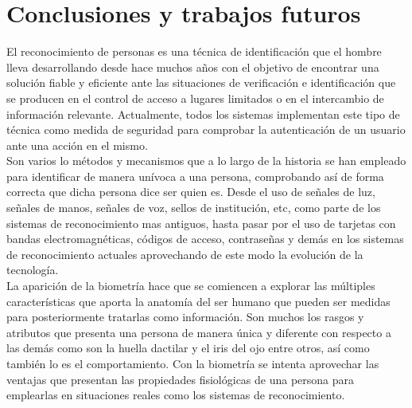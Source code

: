 
\chapter{Conclusiones y trabajos futuros} %

\label{Capítulo 6} %





El reconocimiento de personas es una técnica de identificación que el hombre lleva desarrollando desde hace muchos años con el objetivo de encontrar una solución fiable y eficiente ante las situaciones de verificación e identificación que se producen en el control de acceso a lugares limitados o en el intercambio de información relevante. Actualmente, todos los sistemas implementan este tipo de técnica como medida de seguridad para comprobar la autenticación de un usuario ante una acción en el mismo. \\

Son varios lo métodos y mecanismos que a lo largo de la historia se han empleado para identificar de manera unívoca a una persona, comprobando así de forma correcta que dicha persona dice ser quien es. Desde el uso de señales de luz, señales de manos, señales de voz, sellos de institución, etc, como parte de los sistemas de reconocimiento mas antiguos, hasta pasar por el uso de tarjetas con bandas electromagnéticas, códigos de acceso, contraseñas y demás en los sistemas de reconocimiento actuales aprovechando de este modo la evolución de la tecnología.\\

La aparición de la biometría hace que se comiencen a explorar las múltiples características que aporta la anatomía del ser humano que pueden ser medidas para posteriormente tratarlas como información. Son muchos los rasgos y atributos que presenta una persona de manera única y diferente con respecto a las demás como son la huella dactilar y el iris del ojo entre otros, así como también lo es el comportamiento. Con la biometría se intenta aprovechar las ventajas que presentan las propiedades fisiológicas de una persona para emplearlas en situaciones reales como los sistemas de reconocimiento.\\

